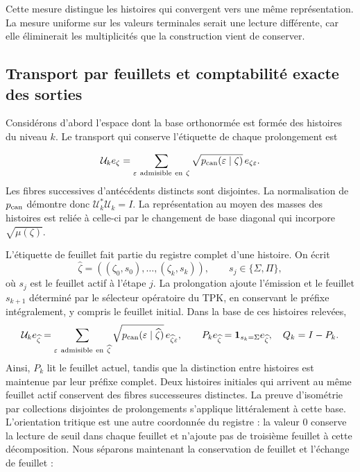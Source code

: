 Cette mesure distingue les histoires qui convergent vers une même représentation. La mesure uniforme sur les valeurs terminales serait une lecture différente, car elle éliminerait les multiplicités que la construction vient de conserver.



\subsection{Transport par feuillets et comptabilité exacte des sorties}
Considérons d'abord l'espace dont la base orthonormée est formée des histoires du niveau \(k\). Le transport qui conserve l'étiquette de chaque prolongement est

\[
\mathcal U_ke_\zeta=
\sum_{\varepsilon\ \mathrm{admisible\ en}\ \zeta}
\sqrt{p_{\rm can}(\varepsilon\mid\zeta)}\,e_{\zeta\varepsilon}.
\]
Les fibres successives d'antécédents distincts sont disjointes. La normalisation de \(p_{\rm can}\) démontre donc \(\mathcal U_k^*\mathcal U_k=I\). La représentation au moyen des masses des histoires est reliée à celle-ci par le changement de base diagonal qui incorpore \(\sqrt{\mu(\zeta)}\).

L'étiquette de feuillet fait partie du registre complet d'une histoire. On écrit
\[
\widehat\zeta=((\zeta_0,s_0),\ldots,(\zeta_k,s_k)),\qquad
s_j\in\{\Sigma,\Pi\},
\]
où \(s_j\) est le feuillet actif à l'étape \(j\). La prolongation ajoute l'émission et le feuillet \(s_{k+1}\) déterminé par le sélecteur opératoire du TPK, en conservant le préfixe intégralement, y compris le feuillet initial. Dans la base de ces histoires relevées,
\[
\mathcal U_ke_{\widehat\zeta}
=\sum_{\varepsilon\ \mathrm{admisible\ en}\ \widehat\zeta}
\sqrt{p_{\rm can}(\varepsilon\mid\widehat\zeta)}\,e_{\widehat\zeta\varepsilon},
\qquad
P_ke_{\widehat\zeta}=\mathbf1_{s_k=\Sigma}e_{\widehat\zeta},\quad
Q_k=I-P_k.
\]
Ainsi, \(P_k\) lit le feuillet actuel, tandis que la distinction entre histoires est maintenue par leur préfixe complet. Deux histoires initiales qui arrivent au même feuillet actif conservent des fibres successeures distinctes. La preuve d’isométrie par collections disjointes de prolongements s’applique littéralement à cette base.
L’orientation tritique est une autre coordonnée du registre : la valeur \(0\) conserve la lecture de seuil dans chaque feuillet et n’ajoute pas de troisième feuillet à cette décomposition. Nous séparons maintenant la conservation de feuillet et l’échange de feuillet :

